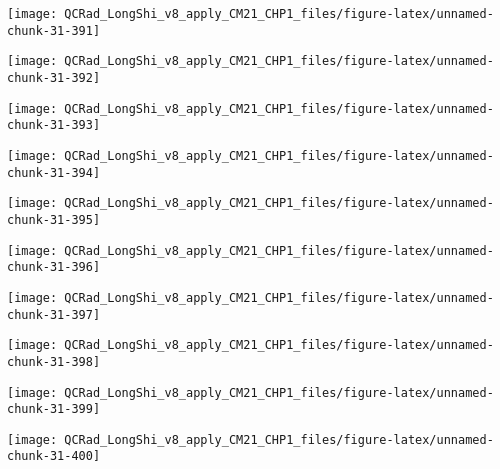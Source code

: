 \documentclass[
  10pt,
  a4paper,oneside]{article}
\begin{document}
\begin{center}\texttt{[image: QCRad\_LongShi\_v8\_apply\_CM21\_CHP1\_files/figure-latex/unnamed-chunk-31-391]} \end{center}

\begin{center}\texttt{[image: QCRad\_LongShi\_v8\_apply\_CM21\_CHP1\_files/figure-latex/unnamed-chunk-31-392]} \end{center}

\begin{center}\texttt{[image: QCRad\_LongShi\_v8\_apply\_CM21\_CHP1\_files/figure-latex/unnamed-chunk-31-393]} \end{center}

\begin{center}\texttt{[image: QCRad\_LongShi\_v8\_apply\_CM21\_CHP1\_files/figure-latex/unnamed-chunk-31-394]} \end{center}

\begin{center}\texttt{[image: QCRad\_LongShi\_v8\_apply\_CM21\_CHP1\_files/figure-latex/unnamed-chunk-31-395]} \end{center}

\begin{center}\texttt{[image: QCRad\_LongShi\_v8\_apply\_CM21\_CHP1\_files/figure-latex/unnamed-chunk-31-396]} \end{center}

\begin{center}\texttt{[image: QCRad\_LongShi\_v8\_apply\_CM21\_CHP1\_files/figure-latex/unnamed-chunk-31-397]} \end{center}

\begin{center}\texttt{[image: QCRad\_LongShi\_v8\_apply\_CM21\_CHP1\_files/figure-latex/unnamed-chunk-31-398]} \end{center}

\begin{center}\texttt{[image: QCRad\_LongShi\_v8\_apply\_CM21\_CHP1\_files/figure-latex/unnamed-chunk-31-399]} \end{center}

\begin{center}\texttt{[image: QCRad\_LongShi\_v8\_apply\_CM21\_CHP1\_files/figure-latex/unnamed-chunk-31-400]} \end{center}
\end{document}
